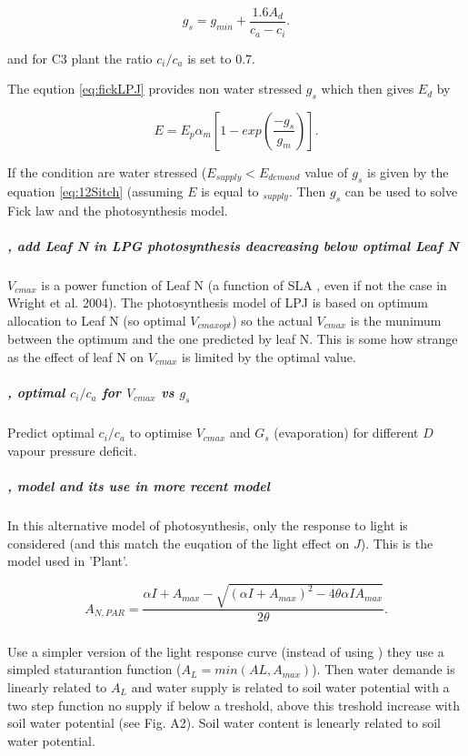 \documentclass[a4paper,11pt]{article}
\begin{document}
\begin{equation}
\label{eq:fickLPJ}
g_s=g_{min} + \frac{1.6A_d}{c_a - c_i}.
\end{equation}

and for C3 plant the ratio $c_i / c_a$ is set to 0.7.

The eqution \ref{eq:fickLPJ} provides non water stressed $g_s$ which then gives $E_{d}$ by

\begin{equation}
\label{eq:12Sitch}
E=E_p \alpha_m [1 - exp(\frac{- g_s}{g_m})].
\end{equation}

If the condition are water stressed ($E_{supply} < E_{demand}$ value
of $g_s$ is given by the equation \ref{eq:12Sitch} (assuming $E$ is
equal to $_{supply}$. Then $g_s$ can be used to solve Fick law and the
photosynthesis model.

\subparagraph{\citet{Sakschewski-2015}, add Leaf N in LPG photosynthesis deacreasing below optimal Leaf N}

$V_{cmax}$ is a power function of Leaf N (a function of SLA , even if
not the case in Wright et al. 2004). The photosynthesis model of LPJ
is based on optimum allocation to Leaf N (so optimal $V_{cmax opt}$) so
the actual $V_{cmax}$ is the munimum between the optimum and the one
predicted by leaf N. This is some how strange as the effect of leaf N
on $V_{cmax}$ is limited by the optimal value.

\subparagraph{\citet{Prentice-2014}, optimal $c_i/c_a$ for $V_{cmax}$ vs $g_s$}

Predict optimal $c_i/c_a$ to optimise $V_{cmax}$ and $G_s$ (evaporation) for different $D$ vapour pressure deficit.

\subparagraph{\citet{Johnson-1984}, model and its use in more recent model}

In this alternative model of photosynthesis, only the response to
light is considered (and this match the euqation of the light effect
on $J$). This is the model used in 'Plant'.

\begin{equation}
\label{eq:Johnson}
A_{N,PAR} = \frac{ \alpha I + A_{max} - \sqrt{(\alpha I + A_{max})^2 - 4 \theta \alpha I A_{max}}}{2\theta}.
\end{equation}

\subparagraph{\citet{Farrior-2013}}

Use a simpler version of the light response curve (instead of using
\citet{Johnson-1984}) they use a simpled staturantion function
($A_L = min(AL, A_{max})$). Then water demande is linearly related to
$A_L$ and water supply is related to soil water potential with a two
step function no supply if below a treshold, above this treshold
increase with soil water potential (see Fig. A2). Soil water content
is lenearly related to soil water potential.
\end{document}
